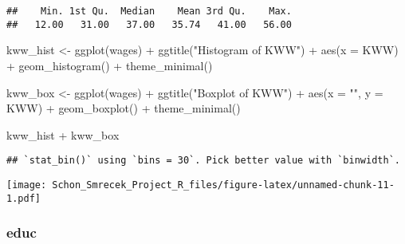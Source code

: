 \documentclass[
]{article}
\newenvironment{Shaded}{\begin{snugshade}}{\end{snugshade}}
\newcommand{\AttributeTok}[1]{\textcolor[rgb]{0.77,0.63,0.00}{#1}}
\newcommand{\FunctionTok}[1]{\textcolor[rgb]{0.00,0.00,0.00}{#1}}
\newcommand{\NormalTok}[1]{#1}
\newcommand{\OtherTok}[1]{\textcolor[rgb]{0.56,0.35,0.01}{#1}}
\newcommand{\SpecialCharTok}[1]{\textcolor[rgb]{0.00,0.00,0.00}{#1}}
\newcommand{\StringTok}[1]{\textcolor[rgb]{0.31,0.60,0.02}{#1}}
\begin{document}
\begin{Shaded}
\end{Shaded}

\begin{verbatim}
##    Min. 1st Qu.  Median    Mean 3rd Qu.    Max. 
##   12.00   31.00   37.00   35.74   41.00   56.00
\end{verbatim}

\begin{Shaded}
\begin{Highlighting}[]
\NormalTok{kww\_hist }\OtherTok{\textless{}{-}} \FunctionTok{ggplot}\NormalTok{(wages) }\SpecialCharTok{+} \FunctionTok{ggtitle}\NormalTok{(}\StringTok{"Histogram of KWW"}\NormalTok{) }\SpecialCharTok{+} \FunctionTok{aes}\NormalTok{(}\AttributeTok{x =}\NormalTok{ KWW) }\SpecialCharTok{+} \FunctionTok{geom\_histogram}\NormalTok{() }\SpecialCharTok{+} \FunctionTok{theme\_minimal}\NormalTok{()}

\NormalTok{kww\_box }\OtherTok{\textless{}{-}} \FunctionTok{ggplot}\NormalTok{(wages) }\SpecialCharTok{+} \FunctionTok{ggtitle}\NormalTok{(}\StringTok{"Boxplot of KWW"}\NormalTok{) }\SpecialCharTok{+} \FunctionTok{aes}\NormalTok{(}\AttributeTok{x =} \StringTok{""}\NormalTok{, }\AttributeTok{y =}\NormalTok{ KWW) }\SpecialCharTok{+} \FunctionTok{geom\_boxplot}\NormalTok{() }\SpecialCharTok{+} \FunctionTok{theme\_minimal}\NormalTok{()}

\NormalTok{kww\_hist }\SpecialCharTok{+}\NormalTok{ kww\_box}
\end{Highlighting}
\end{Shaded}

\begin{verbatim}
## `stat_bin()` using `bins = 30`. Pick better value with `binwidth`.
\end{verbatim}

\texttt{[image: Schon\_Smrecek\_Project\_R\_files/figure-latex/unnamed-chunk-11-1.pdf]}

\hypertarget{educ}{%
\subsubsection{educ}\label{educ}}

\begin{Shaded}
\end{Shaded}
\end{document}
